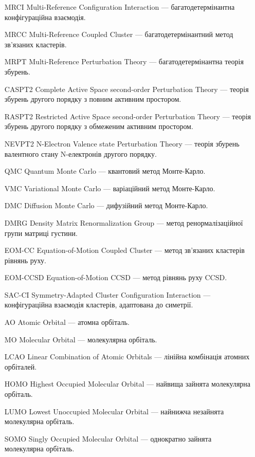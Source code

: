 \begin{enumerate}[
    leftmargin=10em,
    font=\bfseries,   %
    labelindent=5em,%
    leftmargin=*,     %
]
    \item[MRCI] Multi-Reference Configuration Interaction --- багатодетермінантна конфігураційна взаємодія.
    \item[MRCC] Multi-Reference Coupled Cluster --- багатодетермінантний метод зв'язаних кластерів.
    \item[MRPT] Multi-Reference Perturbation Theory --- багатодетермінантна теорія збурень.

    \item[CASPT2] Complete Active Space second-order Perturbation Theory --- теорія збурень другого порядку з повним активним простором.
    \item[RASPT2] Restricted Active Space second-order Perturbation Theory --- теорія збурень другого порядку з обмеженим активним простором.
    \item[NEVPT2] N-Electron Valence state Perturbation Theory --- теорія збурень валентного стану N-електронів другого порядку.

    \item[QMC] Quantum Monte Carlo --- квантовий метод Монте-Карло.
    \item[VMC] Variational Monte Carlo --- варіаційний метод Монте-Карло.
    \item[DMC] Diffusion Monte Carlo --- дифузійний метод Монте-Карло.

    \item[DMRG] Density Matrix Renormalization Group --- метод ренормалізаційної групи матриці густини.

    \item[EOM-CC] Equation-of-Motion Coupled Cluster --- метод зв'язаних кластерів рівнянь руху.
    \item[EOM-CCSD] Equation-of-Motion CCSD --- метод рівнянь руху CCSD.
    \item[SAC-CI] Symmetry-Adapted Cluster Configuration Interaction --- конфігураційна взаємодія кластерів, адаптована до симетрії.

    \item[AO] Atomic Orbital --- атомна орбіталь.
    \item[MO] Molecular Orbital --- молекулярна орбіталь.
    \item[LCAO] Linear Combination of Atomic Orbitals --- лінійна комбінація атомних орбіталей.
    \item[HOMO] Highest Occupied Molecular Orbital --- найвища зайнята молекулярна орбіталь.
    \item[LUMO] Lowest Unoccupied Molecular Orbital --- найнижча незайнята молекулярна орбіталь.
    \item[SOMO] Singly Occupied Molecular Orbital --- однократно зайнята молекулярна орбіталь.


\end{enumerate}
